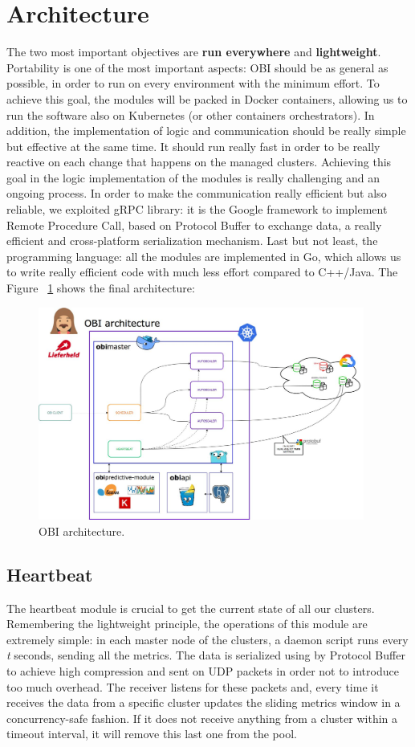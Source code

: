 \documentclass[12pt,twoside,cucitura]{toptesi}
\begin{document}
\section{Architecture} \label{obi-architecture}
The two most important objectives are \textbf{run everywhere} and \textbf{lightweight}. Portability is one of the most important aspects: OBI should be as general as possible, in order to run on every environment with the minimum effort. To achieve this goal, the modules will be packed in Docker containers, allowing us to run the software also on Kubernetes (or other containers orchestrators). In addition, the implementation of logic and communication should be really simple but effective at the same time. It should run really fast in order to be really reactive on each change that happens on the managed clusters. Achieving this goal in the logic implementation of the modules is really challenging and an ongoing process. In order to make the communication really efficient but also reliable, we exploited gRPC \cite{grpc} library: it is the Google framework to implement Remote Procedure Call, based on Protocol Buffer \cite{protobuf} to exchange data, a really efficient and cross-platform serialization mechanism. Last but not least, the programming language: all the modules are implemented in Go, which allows us to write really efficient code with much less effort compared to C++/Java. The Figure ~\ref{fig:obi-architecture} shows the final architecture: 
\begin{figure}
\centering
\includegraphics[height=70mm]{obi-architecture}
\caption{OBI architecture.}\label{fig:obi-architecture}
\end{figure}

\subsection{Heartbeat} 
The heartbeat module is crucial to get the current state of all our clusters. Remembering the lightweight principle, the operations of this module are extremely simple: in each master node of the clusters, a daemon script runs every \textit{t} seconds, sending all the metrics. The data is serialized using by Protocol Buffer to achieve high compression and sent on UDP packets in order not to introduce too much overhead. The receiver listens for these packets and, every time it receives the data from a specific cluster updates the sliding metrics window in a concurrency-safe fashion. If it does not receive anything from a cluster within a timeout interval, it will remove this last one from the pool.
\end{document}
